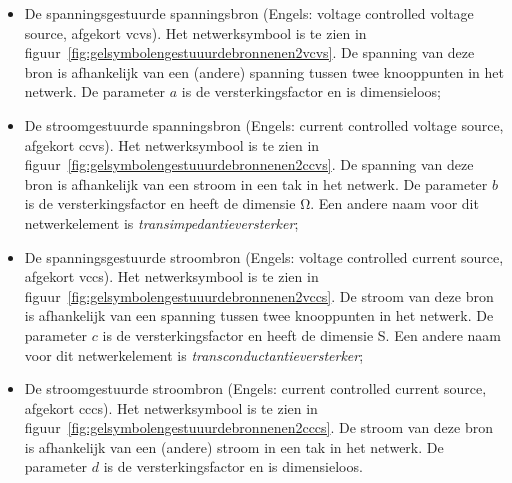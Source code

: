 \begin{itemize}
\item De spanningsgestuurde spanningsbron (Engels: voltage controlled voltage source, afgekort vcvs). Het netwerksymbool is te zien in figuur~\ref{fig:gelsymbolengestuuurdebronnenen2vcvs}. De spanning van deze bron is afhankelijk van een (andere) spanning tussen twee knooppunten in het netwerk. De parameter $a$ is de versterkingsfactor en is dimensieloos;

\item De stroomgestuurde spanningsbron (Engels: current controlled voltage source, afgekort ccvs). Het netwerksymbool is te zien in figuur~\ref{fig:gelsymbolengestuuurdebronnenen2ccvs}. De spanning van deze bron is afhankelijk van een stroom in een tak in het netwerk. De parameter $b$ is de versterkingsfactor en heeft de dimensie \si{\ohm}. Een andere naam voor dit netwerkelement is \textsl{transimpedantieversterker};

\item De spanningsgestuurde stroombron (Engels: voltage controlled current source, afgekort vccs). Het netwerksymbool is te zien in figuur~\ref{fig:gelsymbolengestuuurdebronnenen2vccs}. De stroom van deze bron is afhankelijk van een spanning tussen twee knooppunten in het netwerk. De parameter $c$ is de versterkingsfactor en heeft de dimensie \si{\siemens}. Een andere naam voor dit netwerkelement is \textsl{transconductantieversterker};

\item De stroomgestuurde stroombron (Engels: current controlled current source, afgekort cccs). Het netwerksymbool is te zien in figuur~\ref{fig:gelsymbolengestuuurdebronnenen2cccs}. De stroom van deze bron is afhankelijk van een (andere) stroom in een tak in het netwerk. De parameter $d$ is de versterkingsfactor en is dimensieloos.
\end{itemize}

